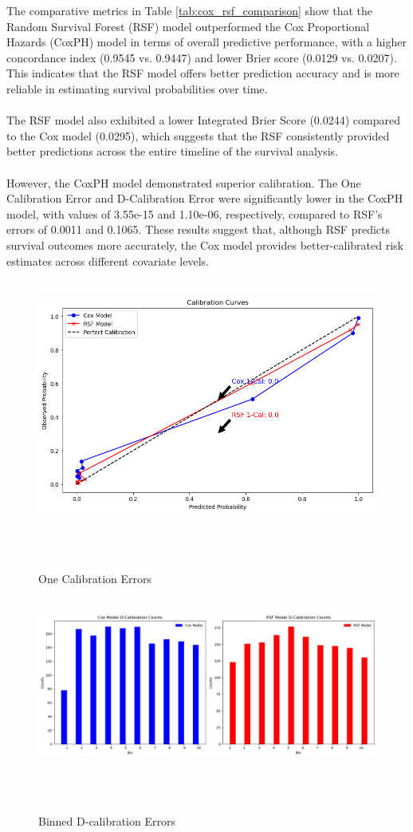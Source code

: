 \noindent The comparative metrics in Table \ref{tab:cox_rsf_comparison} show that the Random Survival Forest (RSF) model outperformed the Cox Proportional Hazards (CoxPH) model in terms of overall predictive performance, with a higher concordance index (0.9545 vs. 0.9447) and lower Brier score (0.0129 vs. 0.0207). This indicates that the RSF model offers better prediction accuracy and is more reliable in estimating survival probabilities over time.
\\\\
\noindent The RSF model also exhibited a lower Integrated Brier Score (0.0244) compared to the Cox model (0.0295), which suggests that the RSF consistently provided better predictions across the entire timeline of the survival analysis.
\\\\
\noindent However, the CoxPH model demonstrated superior calibration. The One Calibration Error and D-Calibration Error were significantly lower in the CoxPH model, with values of 3.55e-15 and 1.10e-06, respectively, compared to RSF's errors of 0.0011 and 0.1065. These results suggest that, although RSF predicts survival outcomes more accurately, the Cox model provides better-calibrated risk estimates across different covariate levels.

\clearpage
\begin{figure}[h]
    \centering
    \includegraphics[scale=0.45]{Figures/SURV/calibration.png}
    \caption{One Calibration Errors}
    \label{fig:one_cal}
\end{figure}

\begin{figure}[h]
    \centering
    \includegraphics[scale=0.35]{Figures/SURV/binned_d_cal.png}
    \caption{Binned D-calibration Errors}
    \label{fig:d_cal}
\end{figure}

